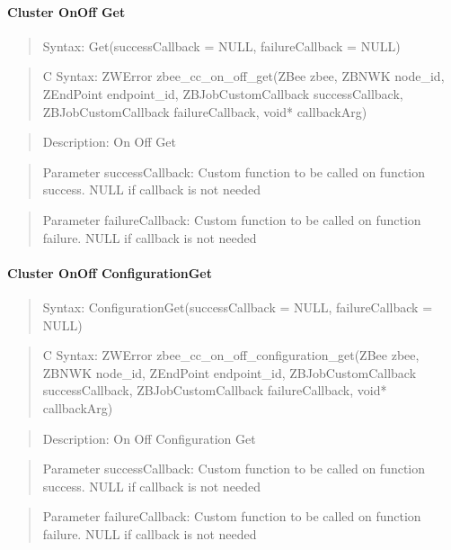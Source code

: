 \paragraph{Cluster OnOff Get}
\begin{quote}Syntax: Get(successCallback = NULL, failureCallback = NULL)\end{quote}
\begin{quote}C Syntax: ZWError zbee\_cc\_on\_off\_get(ZBee zbee, ZBNWK node\_id, ZEndPoint endpoint\_id, ZBJobCustomCallback successCallback, ZBJobCustomCallback failureCallback, void* callbackArg)\end{quote}
\begin{quote}Description: On Off Get\end{quote}
\begin{quote}Parameter successCallback: Custom function to be called on function success. NULL if callback is not needed\end{quote}
\begin{quote}Parameter failureCallback: Custom function to be called on function failure. NULL if callback is not needed\end{quote}


\paragraph{Cluster OnOff ConfigurationGet}
\begin{quote}Syntax: ConfigurationGet(successCallback = NULL, failureCallback = NULL)\end{quote}
\begin{quote}C Syntax: ZWError zbee\_cc\_on\_off\_configuration\_get(ZBee zbee, ZBNWK node\_id, ZEndPoint endpoint\_id, ZBJobCustomCallback successCallback, ZBJobCustomCallback failureCallback, void* callbackArg)\end{quote}
\begin{quote}Description: On Off Configuration Get\end{quote}
\begin{quote}Parameter successCallback: Custom function to be called on function success. NULL if callback is not needed\end{quote}
\begin{quote}Parameter failureCallback: Custom function to be called on function failure. NULL if callback is not needed\end{quote}


